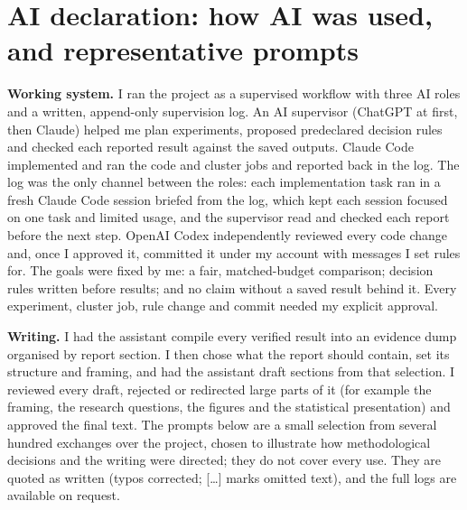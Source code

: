 \section*{AI declaration: how AI was used, and representative prompts}
\small
\textbf{Working system.} I ran the project as a supervised workflow with three
AI roles and a written, append-only supervision log. An AI supervisor (ChatGPT
at first, then Claude) helped me plan experiments, proposed
predeclared decision rules and checked each reported result against the saved
outputs. Claude Code implemented and ran the code and cluster jobs and reported
back in the log. The log was the only channel between the roles: each
implementation task ran in a fresh Claude Code session briefed from the log,
which kept each session focused on one task and limited usage, and the
supervisor read and checked each report before the next step. OpenAI Codex independently reviewed every code change and, once
I approved it, committed it under my account with messages I set rules for. The
goals were fixed by me: a fair, matched-budget comparison; decision rules
written before results; and no claim without a saved result behind it. Every
experiment, cluster job, rule change and commit needed my explicit approval.

\textbf{Writing.} I had the assistant compile every verified result into an
evidence dump organised by report section. I then chose what the report should
contain, set its structure and framing, and had the assistant draft sections
from that selection. I reviewed every draft, rejected or redirected large parts
of it (for example the framing, the research questions, the figures and the
statistical presentation) and approved the final text. The prompts below
are a small selection from several hundred exchanges over the project, chosen
to illustrate how methodological decisions and the writing were directed; they
do not cover every use. They are quoted as written (typos corrected; [\ldots]
marks omitted text), and the full logs are available on request.

